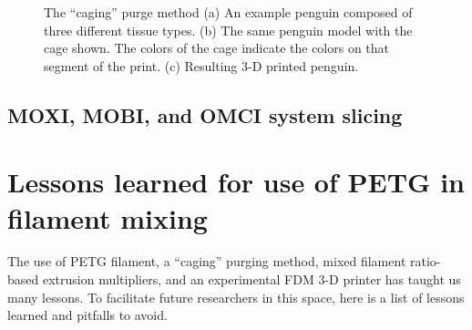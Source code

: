 \begin{figure}
	\begin{center}
	\end{center}
	\caption{The ``caging'' purge method (a) An example penguin composed of three different tissue types. (b) The same penguin model with the cage shown. The colors of the cage indicate the colors on that segment of the print. (c) Resulting 3-D printed penguin. } 
	\label{fig:caging}
\end{figure} 

\subsection{MOXI, MOBI, and OMCI system slicing}



\section{Lessons learned for use of PETG in filament mixing}
The use of PETG filament, a ``caging'' purging method, mixed filament ratio-based extrusion multipliers, and an experimental FDM 3-D printer has taught us many lessons. To facilitate future researchers in this space, here is a list of lessons learned and pitfalls to avoid. 

